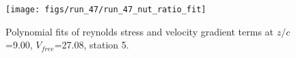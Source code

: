 \begin{figure}[H]
\centering
\texttt{[image: figs/run\_47/run\_47\_nut\_ratio\_fit]}
\caption{Polynomial fits of reynolds stress and velocity gradient terms at $z/c$=9.00, $V_{free}$=27.08, station 5.}
\label{fig:run_47_nut_ratio_fit}
\end{figure}


